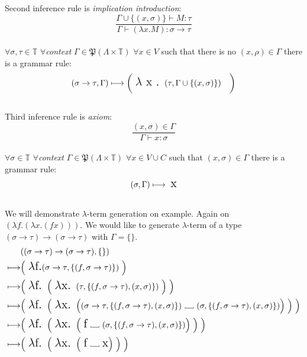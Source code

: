 \documentclass[12pt,a4paper]{report}
\newcommand{\lterm}{$\lambda$-term\xspace}
\newcommand\Vtextvisiblespace[1][.3em]{%
  \mbox{\kern.06em\vrule height.3ex}%
  \vbox{\hrule width#1}%
  \hbox{\vrule height.3ex}}
\begin{document}
Second inference rule is {\it implication introduction}: 
\[
	\frac{\Gamma \cup \{ ( x,\sigma ) \} \vdash M : \tau }
	     {\Gamma \vdash (\lambda x . M) : \sigma \rightarrow \tau }
\]
\\
$\forall \sigma, \tau \in \mathbb{T}$ 
$\forall${\it context} $\Gamma \in \mathfrak P \left({\Lambda \times  \mathbb{T}}\right) $ 
$\forall x \in V $ such that there is no $(x,\rho) \in \Gamma$ 
there is a grammar rule:
\[ 
	( \sigma \rightarrow \tau , \Gamma )  \longmapsto
	\bigg( \mbox{ {\Large $\lambda$ x . }}( \tau , \Gamma \cup \{ (x,\sigma) \} ) \quad \bigg)
\]
\\	

Third inference rule is {\it axiom}: 
\[
		\frac{( x , \sigma )  \in \Gamma}
		     {\Gamma \vdash x : \sigma}
\]
\\
$\forall \sigma \in \mathbb{T}$ 
$\forall${\it context} $\Gamma \in \mathfrak P \left({\Lambda \times  \mathbb{T}}\right) $ 
$\forall x \in V \cup C $ such that $(x,\sigma) \in \Gamma$ 
there is a grammar rule:
\[ 
	( \sigma , \Gamma )  \longmapsto \mbox{ {\Large x}}
\]
\\

We will demonstrate \lterm generation on example. 
Again on $(\lambda f . (\lambda x . (f x) ))$. 
We would like to generate \lterm of a type 
$(\sigma \rightarrow \tau) \rightarrow (\sigma \rightarrow \tau)$
with $\Gamma = \{\}$.
\begin{align*}
	& ((\sigma \rightarrow \tau) \rightarrow (\sigma \rightarrow \tau),\{\}) \\ 
	\longmapsto & \Big( \mbox{ {\Large $\lambda$f.}}
	  ( \sigma \rightarrow \tau , \{ (f,\sigma \rightarrow \tau) \} ) 
	~ \Big)
	\\
	\longmapsto & 
	\Big( \mbox{ {\Large $\lambda$f. }}
		\Big( \mbox{ {\Large $\lambda$x. }}
	  	 	( \tau , \{ (f,\sigma \rightarrow \tau) , (x,\sigma) \} ) 
		~ \Big)  	 
	~ \Big)
	\\
	\longmapsto & 
	\Big( \mbox{ {\Large $\lambda$f. }}
		\Big( \mbox{ {\Large $\lambda$x. }}	  	 	
	  	 	\Big( 
	  	 	  ( \sigma \rightarrow \tau , \{ (f,\sigma \rightarrow \tau) , (x,\sigma) \} ) 
			  \mbox{ \Vtextvisiblespace[1em] } 
			  ( \sigma , \{ (f,\sigma \rightarrow \tau) , (x,\sigma) \} )  \Big) 
		~ \Big)  	 
	 ~ \Big)
	\\
	\longmapsto & 
	\Big( \mbox{ {\Large $\lambda$f. }}
		\Big( \mbox{ {\Large $\lambda$x. }}	  	 	
	  	 	\Big( 
	  	 	  \mbox{ {\Large f}} 
			  \mbox{ \Vtextvisiblespace[1em] } 
			  ( \sigma , \{ (f,\sigma \rightarrow \tau) , (x,\sigma) \} ) \Big) 
		~ \Big)  	 
	~ \Big)		
	\\
	\longmapsto & 
	\Big( \mbox{ {\Large $\lambda$f. }}
		\Big( \mbox{ {\Large $\lambda$x. }}	  	 	
	  	 	\Big( 
	  	 	  \mbox{ {\Large f}} 
			  \mbox{ \Vtextvisiblespace[1em] } 
			  \mbox{{\Large x}} \Big) 
		~ \Big)  	 
	~ \Big)
\end{align*}
\end{document}
